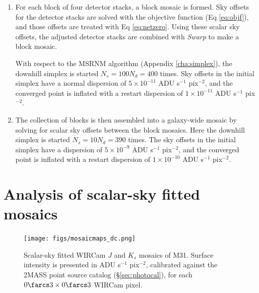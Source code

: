\documentclass[iop]{emulateapj}
\newcommand{\ie}{\textit{i.e.}}
\newcommand{\vect}[1]{\boldsymbol{#1}} %
\newcommand{\sw}[1]{\textit{#1}} %
\begin{document}
\begin{enumerate}
    \item\label{ls:blockopt} For each block of four detector stacks, a block mosaic is formed. Sky offsets for the detector stacks are solved with the objective function (Eq \ref{eq:objf}), and those offsets are treated with Eq \ref{eq:netzero}. Using these scalar sky offsets, the adjusted detector stacks are combined with \sw{Swarp} to make a block mosaic.
    
    With respect to the MSRNM algorithm (Appendix \ref{cha:simplex}), the downhill simplex is started $N_s=100N_d=400$ times. Sky offsets in the initial simplex have a normal dispersion of $5\times10^{-11}$ ADU s$^{-1}$ pix$^{-2}$, and the converged point is inflated with a restart dispersion of $1\times10^{-11}$ ADU s$^{-1}$ pix$^{-2}$.
    
    \item\label{ls:mosaicopt} The collection of blocks is then assembled into a galaxy-wide mosaic by solving for scalar sky offsets between the block mosaics. Here the downhill simplex is started $N_s=10N_d=390$ times. The sky offsets in the initial simplex have a dispersion of $5\times10^{-9}$ ADU s$^{-1}$ pix$^{-2}$, and the converged point is inflated with a restart dispersion of $1\times10^{-10}$ ADU s$^{-1}$ pix$^{-2}$.

\end{enumerate}

\section{Analysis of scalar-sky fitted mosaics}
\label{sec:scalaranalysis}

\begin{figure}[p]
    \centering
        \texttt{[image: figs/mosaicmaps\_dc.png]}
    \caption[Scalar-sky fitted WIRCam $J$ and $K_s$ mosaics of M31]{Scalar-sky fitted WIRCam $J$ and $K_s$ mosaics of M31. Surface intensity is presented in ADU s$^{-1}$ pix$^{-2}$, calibrated against the 2MASS point source catalog (\S\ref{sec:photocal}), for each $0\farcs3\times0\farcs3$ WIRCam pixel.}
    \label{fig:mosaicmaps_dc}
\end{figure}
\end{document}
